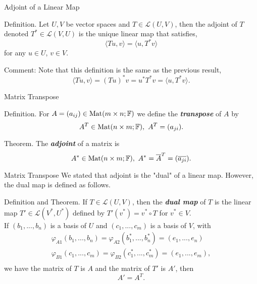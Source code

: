 \documentclass[hyperref={pdfpagelabels=true}]{beamer}
\renewcommand{\L}{\mathcal{L}}
\newcommand{\Mat}{\text{Mat}}
\newcommand{\highlightg}[1]{\textcolor[rgb]{0.1,0.5,0.3}{\emph{\textbf{#1}}}}
\newcommand{\<}{\langle}
\renewcommand{\>}{\rangle}
\begin{document}
\begin{frame}{Adjoint of a Linear Map}
    \begin{block}{Definition.}
        Let $U,V$ be vector spaces and $T \in \L(U,V)$, then the adjoint of $T$ denoted $T^{*} \in \L(V,U)$ is the unique linear map that satisfies,
        \[\<Tu,v\> = \<u,T^{*}v\>\]
        for any $u \in U$, $v \in V$.
    \end{block}
    \begin{block}{Comment:}
        Note that this definition is the same as the previous result,
        \[\<Tu,v\> = (Tu)^{*}v = u^{*}T^{*}v = \<u,T^{*}v\>.\]
    \end{block}
\end{frame}
\begin{frame}{Matrix Transpose}
    \begin{block}{Definition.}
        For $A = (a_{ij}) \in \Mat(m \times n;\F)$ we define the \highlightg{transpose} of $A$ by 
        \[A^{T} \in \Mat(n \times m;\F),\ A^{T} = (a_{ji}).\]
    \end{block}
    \begin{block}{Theorem.}
        The \highlightg{adjoint} of a matrix is 
        \[A^{*} \in \Mat(n \times m;\F),\ A^{*} = \overline{A}^{T} = (\overline{a_{ji}}).\]
    \end{block}
\end{frame}
\begin{frame}{Matrix Transpose}
    We stated that adjoint is the "dual" of a linear map. However, the dual map is defined as follows.
    \begin{block}{Definition and Theorem.}
        If $T \in \L(U,V)$, then the \highlightg{dual map} of $T$ is the linear map $T' \in \L(V^{*},U^{*})$ defined by $T'(v^{*}) = v^{*} \circ T$ for $v^{*} \in V$.\\
        If $(b_{1},...,b_{n})$ is a basis of $U$ and $(c_{1},...,c_{m})$ is a basis of $V$, with 
        \[
            \begin{aligned}
                \varphi_{A1}(b_{1},...,b_{n}) = \varphi_{A2}(b_{1}^{*},...,b_{n}^{*}) = (e_{1},...,e_{n})\\
                \varphi_{B1}(c_{1},...,c_{m}) = \varphi_{B2}(c_{1}^{*},...,c_{m}^{*}) = (e_{1},...,e_{m}),\\
            \end{aligned}
        \]
        we have the matrix of $T$ is $A$ and the matrix of $T'$ is $A'$, then
        \[A' = A^{T}.\]
    \end{block}
\end{frame}
\end{document}
